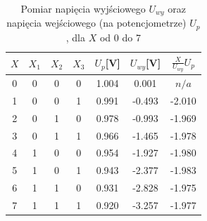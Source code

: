 \begin{table}[H]
	\centering
	\begin{tabular}{c|c c c|c||c|c}
		\hline
		\(X\) & \(X_1\) & \(X_2\) & \(X_3\) & \(U_p\)[V] & \(U_{wy}\)[V] & \(\frac{X}{U_{wy}} U_p\) \\ \hline\hline
		0     & 0       & 0       & 0       & 1.004      & 0.001         & \(n/a\)                  \\ \hline
		1     & 0       & 0       & 1       & 0.991      & -0.493        & -2.010                   \\ \hline
		2     & 0       & 1       & 0       & 0.978      & -0.993        & -1.969                   \\ \hline
		3     & 0       & 1       & 1       & 0.966      & -1.465        & -1.978                   \\ \hline
		4     & 1       & 0       & 0       & 0.954      & -1.927        & -1.980                   \\ \hline
		5     & 1       & 0       & 1       & 0.943      & -2.377        & -1.983                   \\ \hline
		6     & 1       & 1       & 0       & 0.931      & -2.828        & -1.975                   \\ \hline
		7     & 1       & 1       & 1       & 0.920      & -3.257        & -1.977                   \\ \hline
	\end{tabular}
	\caption{Pomiar napięcia wyjściowego \(U_{wy}\) oraz napięcia wejściowego (na potencjometrze) \(U_p\), dla \(X\) od 0 do 7}
	\label{tab1}
\end{table}
